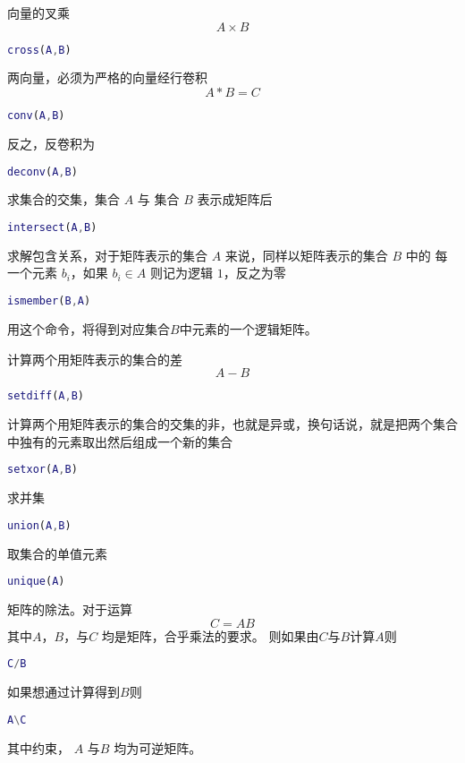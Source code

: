 \documentclass{ctexart}
\begin{document}
  向量的叉乘
  $$A \times B$$
  \begin{lstlisting}[language=matlab]
  cross(A,B)
  \end{lstlisting}

  两向量，必须为严格的向量经行卷积
  $$A*B=C$$
  \begin{lstlisting}[language=matlab]
  conv(A,B)
  \end{lstlisting}
  反之，反卷积为
  \begin{lstlisting}[language=matlab]
  deconv(A,B)
  \end{lstlisting}
 
  求集合的交集，集合 $A$ 与 集合 $B$ 表示成矩阵后
  \begin{lstlisting}[language=matlab]
  intersect(A,B)
  \end{lstlisting}
  
  求解包含关系，对于矩阵表示的集合 $A$ 来说，同样以矩阵表示的集合 $B$ 中的
  每一个元素 $b_i$，如果 $b_i \in A$ 则记为逻辑 $1$，反之为零
  \begin{lstlisting}[language=matlab]
  ismember(B,A)
  \end{lstlisting}
  用这个命令，将得到对应集合$B$中元素的一个逻辑矩阵。
  
  计算两个用矩阵表示的集合的差
  $$A-B$$
 \begin{lstlisting}[language=matlab]
 setdiff(A,B)
 \end{lstlisting}
 
 计算两个用矩阵表示的集合的交集的非，也就是异或，换句话说，就是把两个集合中独有的元素取出然后组成一个新的集合
 \begin{lstlisting}[language=matlab]
 setxor(A,B)
 \end{lstlisting}
 
 求并集
 \begin{lstlisting}[language=matlab]
 union(A,B)
 \end{lstlisting}
 
 取集合的单值元素
 \begin{lstlisting}[language=matlab]
 unique(A)
 \end{lstlisting}
 
 矩阵的除法。对于运算
 $$C=AB$$
 其中$A$，$B$，与$C$ 均是矩阵，合乎乘法的要求。
 则如果由$C$与$B$计算$A$则
 \begin{lstlisting}[language=matlab]
 C/B
 \end{lstlisting}
 如果想通过计算得到$B$则
 \begin{lstlisting}[language=matlab]
 A\C
 \end{lstlisting}
 其中约束， $A$ 与$B$ 均为可逆矩阵。
 
 
 
 \begin{lstlisting}[language=matlab]
 
 \end{lstlisting}
\end{document}

